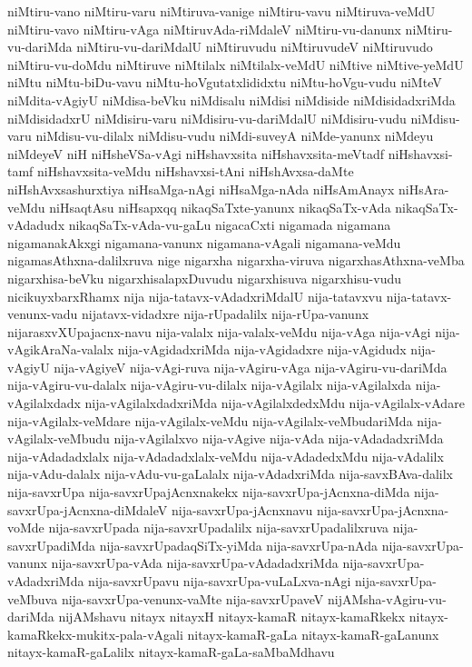 {niMtiru-vano
niMtiru-varu
niMtiruva-vanige
niMtiru-vavu
niMtiruva-veMdU
niMtiru-vavo
niMtiru-vAga
niMtiruvAda-riMdaleV
niMtiru-vu-danunx
niMtiru-vu-dariMda
niMtiru-vu-dariMdalU
niMtiruvudu
niMtiruvudeV
niMtiruvudo
niMtiru-vu-doMdu
niMtiruve
niMtilalx
niMtilalx-veMdU
niMtive
niMtive-yeMdU
niMtu
niMtu-biDu-vavu
niMtu-hoVgutatxlididxtu
niMtu-hoVgu-vudu
niMteV
niMdita-vAgiyU
niMdisa-beVku
niMdisalu
niMdisi
niMdiside
niMdisidadxriMda
niMdisidadxrU
niMdisiru-varu
niMdisiru-vu-dariMdalU
niMdisiru-vudu
niMdisu-varu
niMdisu-vu-dilalx
niMdisu-vudu
niMdi-suveyA
niMde-yanunx
niMdeyu
niMdeyeV
niH
niHsheVSa-vAgi
niHshavxsita
niHshavxsita-meVtadf
niHshavxsi-tamf
niHshavxsita-veMdu
niHshavxsi-tAni
niHshAvxsa-daMte
niHshAvxsashurxtiya
niHsaMga-nAgi
niHsaMga-nAda
niHsAmAnayx
niHsAra-veMdu
niHsaqtAsu
niHsapxqq
nikaqSaTxte-yanunx
nikaqSaTx-vAda
nikaqSaTx-vAdadudx
nikaqSaTx-vAda-vu-gaLu
nigacaCxti
nigamada
nigamana
nigamanakAkxgi
nigamana-vanunx
nigamana-vAgali
nigamana-veMdu
nigamasAthxna-dalilxruva
nige
nigarxha
nigarxha-viruva
nigarxhasAthxna-veMba
nigarxhisa-beVku
nigarxhisalapxDuvudu
nigarxhisuva
nigarxhisu-vudu
nicikuyxbarxRhamx
nija
nija-tatavx-vAdadxriMdalU
nija-tatavxvu
nija-tatavx-venunx-vadu
nijatavx-vidadxre
nija-rUpadalilx
nija-rUpa-vanunx
nijarasxvXUpajacnx-navu
nija-valalx
nija-valalx-veMdu
nija-vAga
nija-vAgi
nija-vAgikAraNa-valalx
nija-vAgidadxriMda
nija-vAgidadxre
nija-vAgidudx
nija-vAgiyU
nija-vAgiyeV
nija-vAgi-ruva
nija-vAgiru-vAga
nija-vAgiru-vu-dariMda
nija-vAgiru-vu-dalalx
nija-vAgiru-vu-dilalx
nija-vAgilalx
nija-vAgilalxda
nija-vAgilalxdadx
nija-vAgilalxdadxriMda
nija-vAgilalxdedxMdu
nija-vAgilalx-vAdare
nija-vAgilalx-veMdare
nija-vAgilalx-veMdu
nija-vAgilalx-veMbudariMda
nija-vAgilalx-veMbudu
nija-vAgilalxvo
nija-vAgive
nija-vAda
nija-vAdadadxriMda
nija-vAdadadxlalx
nija-vAdadadxlalx-veMdu
nija-vAdadedxMdu
nija-vAdalilx
nija-vAdu-dalalx
nija-vAdu-vu-gaLalalx
nija-vAdadxriMda
nija-savxBAva-dalilx
nija-savxrUpa
nija-savxrUpajAcnxnakekx
nija-savxrUpa-jAcnxna-diMda
nija-savxrUpa-jAcnxna-diMdaleV
nija-savxrUpa-jAcnxnavu
nija-savxrUpa-jAcnxna-voMde
nija-savxrUpada
nija-savxrUpadalilx
nija-savxrUpadalilxruva
nija-savxrUpadiMda
nija-savxrUpadaqSiTx-yiMda
nija-savxrUpa-nAda
nija-savxrUpa-vanunx
nija-savxrUpa-vAda
nija-savxrUpa-vAdadadxriMda
nija-savxrUpa-vAdadxriMda
nija-savxrUpavu
nija-savxrUpa-vuLaLxva-nAgi
nija-savxrUpa-veMbuva
nija-savxrUpa-venunx-vaMte
nija-savxrUpaveV
nijAMsha-vAgiru-vu-dariMda
nijAMshavu
nitayx
nitayxH
nitayx-kamaR
nitayx-kamaRkekx
nitayx-kamaRkekx-mukitx-pala-vAgali
nitayx-kamaR-gaLa
nitayx-kamaR-gaLanunx
nitayx-kamaR-gaLalilx
nitayx-kamaR-gaLa-saMbaMdhavu
}
